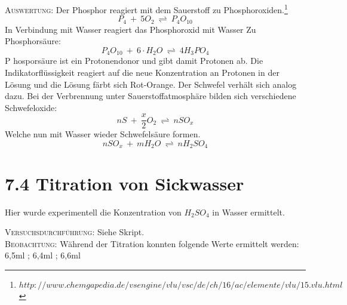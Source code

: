 \documentclass[11pt, a4paper]{article}
\begin{document}
\textsc{Auswertung:}\hspace{8mm} Der Phosphor reagiert mit dem Sauerstoff zu Phosphoroxiden.\footnote{$http://www.chemgapedia.de/vsengine/vlu/vsc/de/ch/16/ac/elemente/vlu/15.vlu.html$} $$P_4\ +\ 5O_2\ \rightleftharpoons\ P_4O_{10}$$ In Verbindung mit Wasser reagiert das Phosphoroxid mit Wasser Zu Phosphorsäure: $$P_4O_{10}\ +\ 6\cdot H_2O\ \rightleftharpoons\ 4H_3PO_4$$ P
hosporsäure ist ein Protonendonor und gibt damit Protonen ab. Die Indikatorflüssigkeit reagiert auf die neue Konzentration an Protonen in der Lösung und die Lösung färbt sich Rot-Orange. Der Schwefel verhält sich analog dazu. Bei der Verbrennung unter Sauerstoffatmosphäre bilden sich verschiedene Schwefeloxide: $$nS\ +\ \frac{x}{2} O_2\ \rightleftharpoons\ nSO_x$$ Welche nun mit Wasser wieder Schwefelsäure formen. $$nSO_x\ +\ mH_2O\ \rightleftharpoons\ nH_2SO_4$$ 


\newpage
\section{7.4 Titration von Sickwasser}

Hier wurde experimentell die Konzentration von $H_2SO_4$ in Wasser ermittelt.

\textsc{Versuchsdurchführung:} Siehe Skript.\\

\textsc{Beobachtung:}\hspace{5mm} Während der Titration konnten folgende Werte ermittelt werden: 6,5ml ; 6,4ml ; 6,6ml\\
\end{document}
